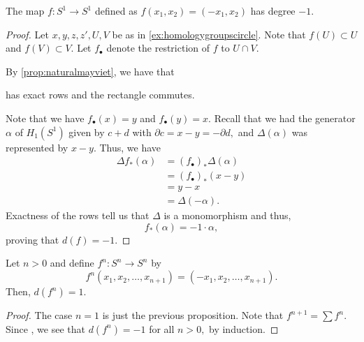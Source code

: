 \documentclass[12pt]{article}
\begin{document}
\begin{prop}
	The map $f:S^1 \to S^1$ defined as $f(x_1, x_2) = (-x_1, x_2)$ has degree $-1.$
\end{prop}
\begin{proof} 
	Let $x, y, z, z', U, V$ be as in \cref{ex:homologygroupscircle}. Note that $f(U) \subset U$ and $f(V) \subset V.$ Let $f_\bullet$ denote the restriction of $f$ to $U \cap V.$ 

	By \cref{prop:naturalmayviet}, we have that
	\begin{center}
	\end{center}
	has exact rows and the rectangle commutes.

	Note that we have $f_\bullet(x) = y$ and $f_\bullet(y) = x.$ Recall that we had the generator $\alpha$ of $H_1(S^1)$ given by $c + d$ with $\partial c = x - y = -\partial d,$ and $\Delta(\alpha)$ was represented by $x - y.$ Thus, we have
	\begin{align*} 
		\Delta f_*(\alpha) &= (f_\bullet)_*\Delta (\alpha)\\
		&= (f_\bullet)_*(x - y)\\
		&= y - x\\
		&= \Delta(-\alpha).	
	\end{align*}
	Exactness of the rows tell us that $\Delta$ is a monomorphism and thus,
	\begin{equation*} 
		f_*(\alpha) = -1\cdot\alpha,
	\end{equation*}
	proving that $d(f) = -1.$
\end{proof}

\begin{cor}
	Let $n > 0$ and define $f^n:S^n \to S^n$ by
	\begin{equation*} 
		f^n(x_1, x_2, \ldots, x_{n+1}) = (-x_1, x_2, \ldots, x_{n+1}).
	\end{equation*}
	Then, $d(f^n) = 1.$
\end{cor}
\begin{proof} 
	The case $n = 1$ is just the previous proposition. Note that $f^{n+1} = \sum f^n.$ Since , we see that $d(f^n) = -1$ for all $n > 0,$ by induction.
\end{proof}
\end{document}
